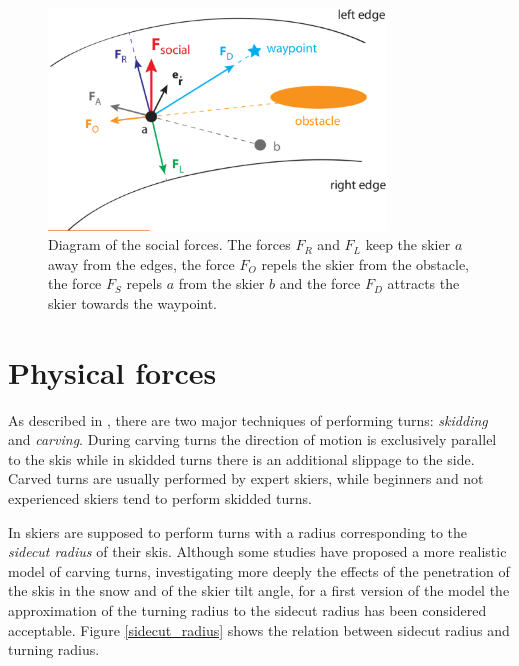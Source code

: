 \documentclass[12pt,a4paper,twoside]{book}
\begin{document}
\begin{figure}[!ht]
  \begin{center}
    \includegraphics[width=0.8\textwidth]{images/social_forces_dia.eps}
    \caption{Diagram of the social forces. The forces $F_R$ and $F_L$ keep the skier $a$ away from the edges, the force $F_O$ repels the skier from the obstacle, the force $F_S$ repels $a$ from the skier $b$ and the force $F_D$ attracts the skier towards the waypoint.}\label{social_forces_diagram}
  \end{center}
\end{figure}


\section{Physical forces}
As described in \cite{hol2012}, there are two major techniques of performing turns: \textit{skidding} and \textit{carving}. During carving turns the direction of motion is exclusively parallel to the skis while in skidded turns there is an additional slippage to the side. Carved turns are usually performed by expert skiers, while beginners and not experienced skiers tend to perform skidded turns.

In \cite{hol2012} skiers are supposed to perform turns with a radius corresponding to the \textit{sidecut radius} of their skis. Although some studies \cite{jen2004} \cite{fe2010} have proposed a more realistic model of carving turns, investigating more deeply the effects of the penetration of the skis in the snow and of the skier tilt angle, for a first version of the model the approximation of the turning radius to the sidecut radius has been considered acceptable. Figure \ref{sidecut_radius} shows the relation between sidecut radius and turning radius.
\end{document}
